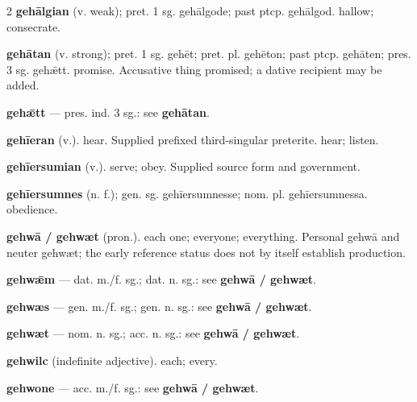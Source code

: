 \begin{multicols*}{2}
\textbf{gehālgian} (v. weak); pret. 1 sg. gehālgode; past ptcp. gehālgod. hallow; consecrate.\par
\textbf{gehātan} (v. strong); pret. 1 sg. gehēt; pret. pl. gehēton; past ptcp. gehāten; pres. 3 sg. gehǣtt. promise. Accusative thing promised; a dative recipient may be added.\par
\textbf{gehǣtt} — pres. ind. 3 sg.: see \textbf{gehātan}.\par
\textbf{gehīeran} (v.). hear. Supplied prefixed third-singular preterite. hear; listen.\par
\textbf{gehīersumian} (v.). serve; obey. Supplied source form and government.\par
\textbf{gehīersumnes} (n. f.); gen. sg. gehīersumnesse; nom. pl. gehīersumnessa. obedience.\par
\textbf{gehwā / gehwæt} (pron.). each one; everyone; everything. Personal gehwā and neuter gehwæt; the early reference status does not by itself establish production.\par
\textbf{gehwǣm} — dat. m./f. sg.; dat. n. sg.: see \textbf{gehwā / gehwæt}.\par
\textbf{gehwæs} — gen. m./f. sg.; gen. n. sg.: see \textbf{gehwā / gehwæt}.\par
\textbf{gehwæt} — nom. n. sg.; acc. n. sg.: see \textbf{gehwā / gehwæt}.\par
\textbf{gehwilc} (indefinite adjective). each; every.\par
\textbf{gehwone} — acc. m./f. sg.: see \textbf{gehwā / gehwæt}.\par

\end{multicols*}
